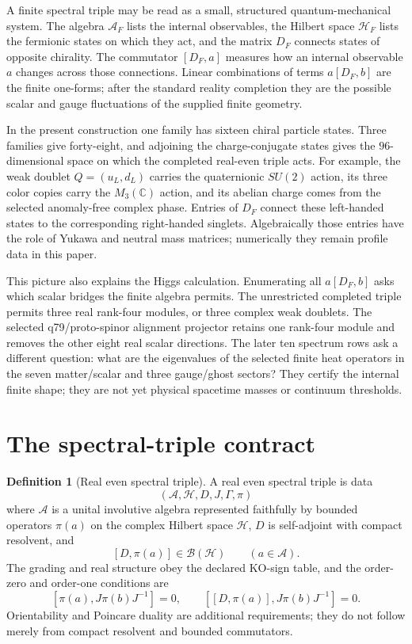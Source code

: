\documentclass[11pt,a4paper,twoside]{article}
\theoremstyle{plain}
\theoremstyle{definition}
\newtheorem{definition}[theorem]{Definition}
\theoremstyle{remark}
\newcommand{\CC}{\mathbb{C}}
\newcommand{\AF}{\mathcal{A}_{F}}
\newcommand{\HF}{\mathcal{H}_{F}}
\newcommand{\DF}{D_{F}}
\begin{document}
A finite spectral triple may be read as a small, structured quantum-mechanical
system.  The algebra $\AF$ lists the internal observables, the Hilbert space
$\HF$ lists the fermionic states on which they act, and the matrix $\DF$
connects states of opposite chirality.  The commutator $[\DF,a]$ measures how
an internal observable $a$ changes across those connections.  Linear
combinations of terms $a[\DF,b]$ are the finite one-forms; after the standard
reality completion they are the possible scalar and gauge fluctuations of
the supplied finite geometry.

In the present construction one family has sixteen chiral particle states.
Three families give forty-eight, and adjoining the charge-conjugate states
gives the $96$-dimensional space on which the completed real-even triple acts.
For example, the weak doublet $Q=(u_L,d_L)$ carries the quaternionic
$SU(2)$ action, its three color copies carry the $M_3(\CC)$ action, and its
abelian charge comes from the selected anomaly-free complex phase.  Entries
of $\DF$ connect these left-handed states to the corresponding right-handed
singlets.  Algebraically those entries have the role of Yukawa and neutral
mass matrices; numerically they remain profile data in this paper.

This picture also explains the Higgs calculation.  Enumerating all
$a[\DF,b]$ asks which scalar bridges the finite algebra permits.  The
unrestricted completed triple permits three real rank-four modules, or three
complex weak doublets.  The selected q79/proto-spinor alignment projector
retains one rank-four module and removes the other eight real scalar
directions.  The later ten spectrum rows ask a different question: what are
the eigenvalues of the selected finite heat operators in the seven
matter/scalar and three gauge/ghost sectors?  They certify the internal finite
shape; they are not yet physical spacetime masses or continuum thresholds.

\section{The spectral-triple contract}

\begin{definition}[Real even spectral triple]
A real even spectral triple is data
\[
  (\mathcal{A},\mathcal{H},D,J,\Gamma,\pi)
\]
where $\mathcal{A}$ is a unital involutive algebra represented faithfully by
bounded operators $\pi(a)$ on the complex Hilbert space $\mathcal{H}$,
$D$ is self-adjoint with compact resolvent, and
\[
 [D,\pi(a)]\in\mathcal{B}(\mathcal{H})
 \qquad (a\in\mathcal{A}).
\]
The grading and real structure obey the declared KO-sign table, and the
order-zero and order-one conditions are
\[
 [\pi(a),J\pi(b)J^{-1}]=0,\qquad
 [[D,\pi(a)],J\pi(b)J^{-1}]=0.
\]
Orientability and Poincare duality are additional requirements; they do not
follow merely from compact resolvent and bounded commutators.
\end{definition}
\end{document}
